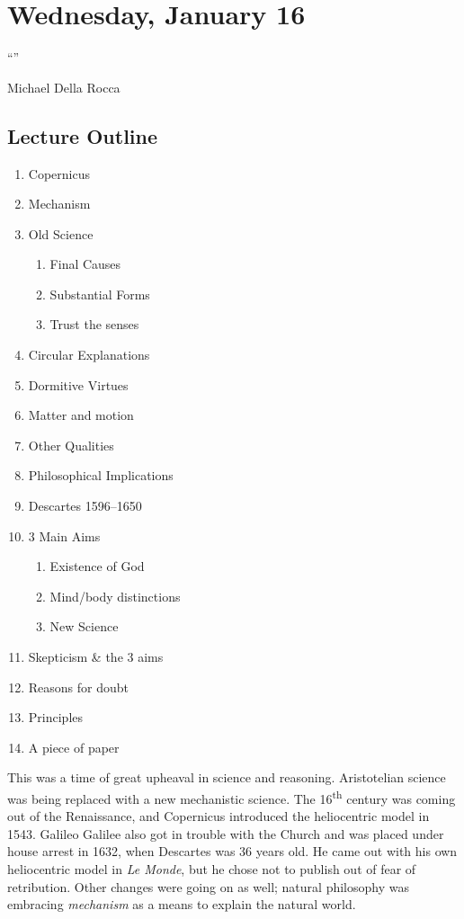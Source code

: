 
\section{Wednesday, January 16}

\epigraph{``''}{Michael Della Rocca}

\subsection*{Lecture Outline}
\begin{multicols}{2}
\begin{enumerate}
\item Copernicus
\item Mechanism
\item Old Science
\begin{enumerate}
\item Final Causes
\item Substantial Forms
\item Trust the senses
\end{enumerate}
\item Circular Explanations
\item Dormitive Virtues
\item Matter and motion
\item Other Qualities
\item Philosophical Implications
\item Descartes 1596--1650
\item 3 Main Aims
\begin{enumerate}
\item Existence of God
\item Mind/body distinctions
\item New Science
\end{enumerate}
\item Skepticism \& the 3 aims
\item Reasons for doubt
\item Principles
\item A piece of paper
\end{enumerate}
\end{multicols}

This was a time of great upheaval in science and reasoning. Aristotelian science was being replaced with a new mechanistic science. The 16\textsuperscript{th} century was coming out of the Renaissance, and Copernicus introduced the heliocentric model in 1543. Galileo Galilee also got in trouble with the Church and was placed under house arrest in 1632, when Descartes was 36 years old. He came out with his own heliocentric model in \emph{Le Monde}, but he chose not to publish out of fear of retribution. Other changes were going on as well; natural philosophy was embracing \emph{mechanism} as a means to explain the natural world.

